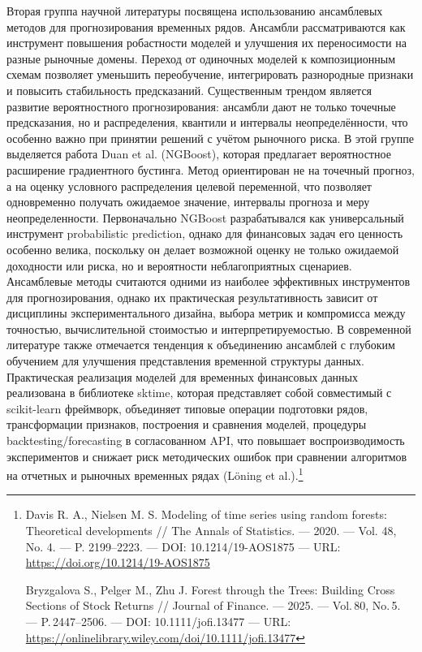 \documentclass[
]{article}
\begin{document}
Вторая группа научной литературы посвящена использованию ансамблевых методов для прогнозирования временных рядов. Ансамбли рассматриваются как инструмент повышения робастности моделей и улучшения их переносимости на разные рыночные домены. Переход от одиночных моделей к композиционным схемам позволяет уменьшить переобучение, интегрировать разнородные признаки и повысить стабильность предсказаний. Существенным трендом является развитие вероятностного прогнозирования: ансамбли дают не только точечные предсказания, но и распределения, квантили и интервалы неопределённости, что особенно важно при принятии решений с учётом рыночного риска. В этой группе выделяется работа Duan et al. (NGBoost), которая предлагает вероятностное расширение градиентного бустинга. Метод ориентирован не на точечный прогноз, а на оценку условного распределения целевой переменной, что позволяет одновременно получать ожидаемое значение, интервалы прогноза и меру неопределенности. Первоначально NGBoost разрабатывался как универсальный инструмент probabilistic prediction, однако для финансовых задач его ценность особенно велика, поскольку он делает возможной оценку не только ожидаемой доходности или риска, но и вероятности неблагоприятных сценариев. Ансамблевые методы считаются одними из наиболее эффективных инструментов для прогнозирования, однако их практическая результативность зависит от дисциплины экспериментального дизайна, выбора метрик и компромисса между точностью, вычислительной стоимостью и интерпретируемостью. В современной литературе также отмечается тенденция к объединению ансамблей с глубоким обучением для улучшения представления временной структуры данных. Практическая реализация моделей для временных финансовых данных реализована в библиотеке sktime, которая представляет собой совместимый с scikit-learn фреймворк, объединяет типовые операции подготовки рядов, трансформации признаков, построения и сравнения моделей, процедуры backtesting/forecasting в согласованном API, что повышает воспроизводимость экспериментов и снижает риск методических ошибок при сравнении алгоритмов на отчетных и рыночных временных рядах (Löning et al.).\footnote{Davis R. A., Nielsen M. S. Modeling of time series using random forests: Theoretical developments // The Annals of Statistics. --- 2020. --- Vol. 48, No. 4. --- P. 2199--2223. --- DOI: 10.1214/19-AOS1875 --- URL: \url{https://doi.org/10.1214/19-AOS1875}

  Bryzgalova S., Pelger M., Zhu J. Forest through the Trees: Building Cross Sections of Stock Returns // Journal of Finance. --- 2025. --- Vol.\,80, No.\,5. --- P.\,2447--2506. --- DOI: 10.1111/jofi.13477 --- URL: \url{https://onlinelibrary.wiley.com/doi/10.1111/jofi.13477}

}
\end{document}
